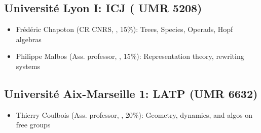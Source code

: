 \vspace{-1.2ex}
\subsection*{Université Lyon I: ICJ (%
  UMR 5208)}
\begin{itemize}
\item Frédéric Chapoton (CR CNRS, \math, 15\%): %
  Trees, Species, Operads, Hopf algebras
\item Philippe Malbos (Ass. professor, \math, 15\%): %
  Representation theory, %
  rewriting systems%
\end{itemize}



\vspace{-1.2ex}
\subsection*{Université Aix-Marseille 1: LATP (UMR 6632)}
\begin{itemize}
\item Thierry Coulbois (Ass. professor, \math, 20\%):
  Geometry, dynamics, and algos on free groups
\end{itemize}

